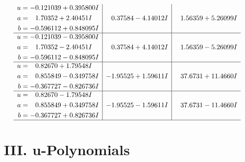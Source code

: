 \documentclass[1p]{elsarticle_modified}
\theoremstyle{definition}
\begin{document}
$$\begin{array}{c|c|c}
\begin{aligned}
u &= -0.121039 + 0.395800 I \\
a &= \phantom{-}1.70352 + 2.40451 I \\
b &= -0.596112 + 0.848095 I\end{aligned}
 & \phantom{-}0.37584 - 4.14012 I & \phantom{-}1.56359 + 5.26099 I \\ \hline\begin{aligned}
u &= -0.121039 - 0.395800 I \\
a &= \phantom{-}1.70352 - 2.40451 I \\
b &= -0.596112 - 0.848095 I\end{aligned}
 & \phantom{-}0.37584 + 4.14012 I & \phantom{-}1.56359 - 5.26099 I \\ \hline\begin{aligned}
u &= \phantom{-}0.82670 + 1.79548 I \\
a &= \phantom{-}0.855849 - 0.349758 I \\
b &= -0.367727 - 0.826736 I\end{aligned}
 & -1.95525 + 1.59611 I & \phantom{-}37.6731 + 11.4660 I \\ \hline\begin{aligned}
u &= \phantom{-}0.82670 - 1.79548 I \\
a &= \phantom{-}0.855849 + 0.349758 I \\
b &= -0.367727 + 0.826736 I\end{aligned}
 & -1.95525 - 1.59611 I & \phantom{-}37.6731 - 11.4660 I\\
 \hline 
 \end{array}$$\newpage
\newpage\renewcommand{\arraystretch}{1}
\centering \section*{ III. u-Polynomials}
\end{document}
